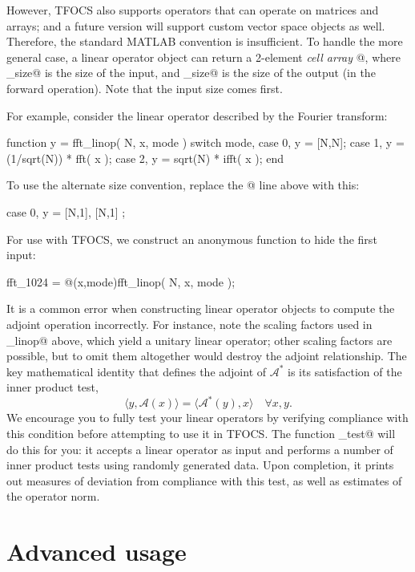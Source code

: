 \documentclass{article}
\newcommand{\cA}{\ensuremath{\mathcal{A}}}    %
\newcommand{\<}{\langle}
\renewcommand{\>}{\rangle}
\begin{document}
However, TFOCS also supports operators that can operate on matrices and
arrays; and a future version will support custom vector space objects
as well. Therefore, the standard MATLAB convention is insufficient. To
handle the more general case, a linear operator object can return a
2-element \emph{cell array} @, where
 \verb@i_size@ is the size of the input, and \verb@o_size@ is
the size of the output (in the forward operation). Note that the input
size comes first.

For example, consider the linear operator described by the Fourier transform:
\begin{code}
	function y = fft_linop( N, x, mode )
	switch mode,
	case 0, y = [N,N];
	case 1, y = (1/sqrt(N)) * fft( x );
	case 2, y = sqrt(N) * ifft( x );
	end
\end{code}
To use the alternate size convention, replace the @ line above with this:
\begin{code}
	case 0, y = { [N,1], [N,1] };
\end{code}
For use with TFOCS, we construct an anonymous function to hide the first input:
\begin{code}
	fft_1024 = @(x,mode)fft_linop( N, x, mode );
\end{code}

It is a common error when constructing linear operator objects to compute
the adjoint operation incorrectly. For instance, note the scaling factors
used in \verb@fft_linop@ above, which yield a unitary linear operator;
other scaling factors are possible, but to omit them altogether would
destroy the adjoint relationship. The key mathematical identity that
defines the adjoint of $\cA^*$ is its satisfaction of the inner product test,
\begin{equation}
	\< y, \cA(x) \> = \< \cA^*(y), x \> \quad \forall x,y.
\end{equation}
We encourage you to fully test your linear operators by verifying compliance
with this condition before attempting to use it in TFOCS.
The function \verb@linop_test@ will do this for you: it
accepts a linear operator as input
and performs a number of inner product tests using randomly generated data.
Upon completion, it prints out measures of deviation from compliance with
this test, as well as estimates of the operator norm.

\section{Advanced usage}
\label{sec:advanced}
\end{document}
